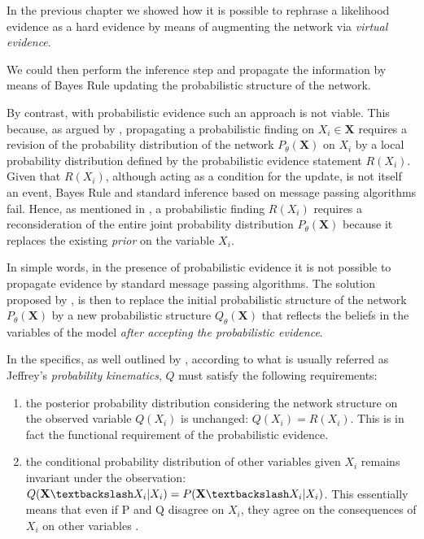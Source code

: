 \documentclass[11pt]{article}
\begin{document}
\begin{article}
In the previous chapter we showed how it is possible to rephrase a
likelihood evidence as a hard evidence by means of augmenting the
network via \emph{virtual evidence}.

We could then perform the inference step and propagate the
information by means of Bayes Rule updating the probabilistic
structure of the network.

By contrast, with probabilistic evidence such an approach is not
viable. This because, as argued by \cite{PENG_2010}, propagating a
probabilistic finding on \(X_i \in \textbf{X}\) requires a revision of
the probability distribution of the network \(P_\theta(\textbf{X})\)
on \(X_i\) by a local probability distribution defined by the
probabilistic evidence statement \(R(X_i)\). Given that \(R(X_i)\),
although acting as a condition for the update, is not itself an
event, Bayes Rule and standard inference based on message passing
algorithms fail. Hence, as mentioned in \cite{Mrad_2015}, a
probabilistic finding \(R(X_i)\) requires a reconsideration of the
entire joint probability distribution \(P_\theta(\textbf{X})\) because
it replaces the existing \emph{prior} on the variable \(X_i\).

In simple words, in the presence of probabilistic evidence it is not
possible to propagate evidence by standard message passing
algorithms. The solution proposed by \cite{jeffrey1990logic}, is then
to replace the initial probabilistic structure of the network
\(P_\theta(\textbf{X})\) by a new probabilistic structure
\(Q_\theta(\textbf{X})\) that reflects the beliefs in the variables of
the model \emph{after accepting the probabilistic evidence}.

In the specifics, as well outlined by \cite{Mrad_2015}, according to
what is usually referred as Jeffrey's \emph{probability kinematics}, \(Q\)
must satisfy the following requirements:

\begin{enumerate}
\item the posterior probability distribution considering the network
structure on the observed variable \(Q(X_i)\) is unchanged: \(Q(X_i)
     = R(X_i)\). This is in fact the functional requirement of the
probabilistic evidence.

\item the conditional probability distribution of other variables given
\(X_i\) remains invariant under the observation: \(Q(\textbf{X}
     \textbackslash X_i | X_i) = P (\textbf{X} \textbackslash X_i |
     X_i)\). This essentially means that even if P and Q disagree on
\(X_i\), they agree on the consequences of \(X_i\) on other variables
\cite{Mrad_2015}.
\end{enumerate}


\end{article}
\end{document}
